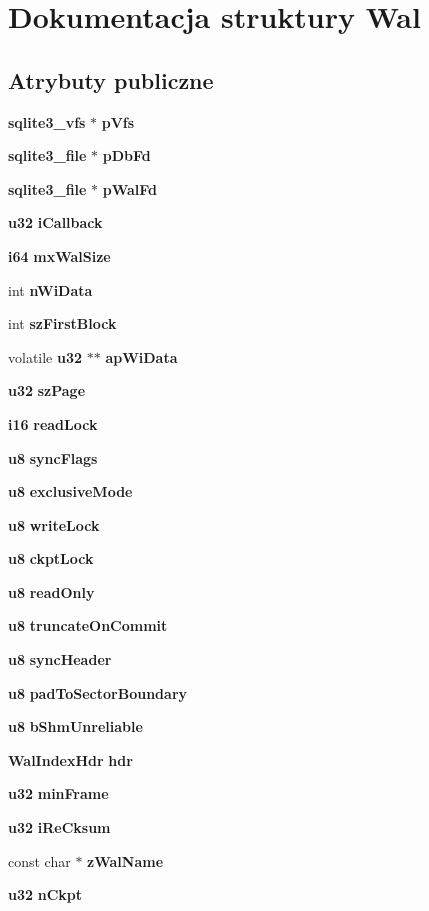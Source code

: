 \section{Dokumentacja struktury Wal}
\label{struct_wal}
\subsection*{Atrybuty publiczne}
\begin{DoxyCompactItemize}
\item 
\textbf{ sqlite3\+\_\+vfs} $\ast$ \textbf{ p\+Vfs}
\item 
\textbf{ sqlite3\+\_\+file} $\ast$ \textbf{ p\+Db\+Fd}
\item 
\textbf{ sqlite3\+\_\+file} $\ast$ \textbf{ p\+Wal\+Fd}
\item 
\textbf{ u32} \textbf{ i\+Callback}
\item 
\textbf{ i64} \textbf{ mx\+Wal\+Size}
\item 
int \textbf{ n\+Wi\+Data}
\item 
int \textbf{ sz\+First\+Block}
\item 
volatile \textbf{ u32} $\ast$$\ast$ \textbf{ ap\+Wi\+Data}
\item 
\textbf{ u32} \textbf{ sz\+Page}
\item 
\textbf{ i16} \textbf{ read\+Lock}
\item 
\textbf{ u8} \textbf{ sync\+Flags}
\item 
\textbf{ u8} \textbf{ exclusive\+Mode}
\item 
\textbf{ u8} \textbf{ write\+Lock}
\item 
\textbf{ u8} \textbf{ ckpt\+Lock}
\item 
\textbf{ u8} \textbf{ read\+Only}
\item 
\textbf{ u8} \textbf{ truncate\+On\+Commit}
\item 
\textbf{ u8} \textbf{ sync\+Header}
\item 
\textbf{ u8} \textbf{ pad\+To\+Sector\+Boundary}
\item 
\textbf{ u8} \textbf{ b\+Shm\+Unreliable}
\item 
\textbf{ Wal\+Index\+Hdr} \textbf{ hdr}
\item 
\textbf{ u32} \textbf{ min\+Frame}
\item 
\textbf{ u32} \textbf{ i\+Re\+Cksum}
\item 
const char $\ast$ \textbf{ z\+Wal\+Name}
\item 
\textbf{ u32} \textbf{ n\+Ckpt}
\end{DoxyCompactItemize}


